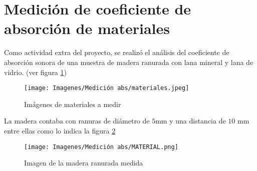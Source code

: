 \section{Medición de coeficiente de absorción de materiales}
Como actividad extra del proyecto, se realizó el análisis del coeficiente de absorción sonora de una muestra de madera ranurada con lana mineral y lana de vidrio. (ver figura \ref{fig: materiales medicion coef abs})
\begin{figure}[H]
    \centering
    \texttt{[image: Imagenes/Medición abs/materiales.jpeg]}
    \caption{Imágenes de materiales a medir}
    \label{fig: materiales medicion coef abs}
\end{figure}

La madera contaba con ranuras de diámetro de $5$mm y una distancia de $10$ mm entre ellas como lo indica la figura \ref{fig: madera medida}
\begin{figure}[H]
    \centering
    \texttt{[image: Imagenes/Medición abs/MATERIAL.png]}
    \caption{Imagen de la madera ranurada medida}
    \label{fig: madera medida}
\end{figure}

